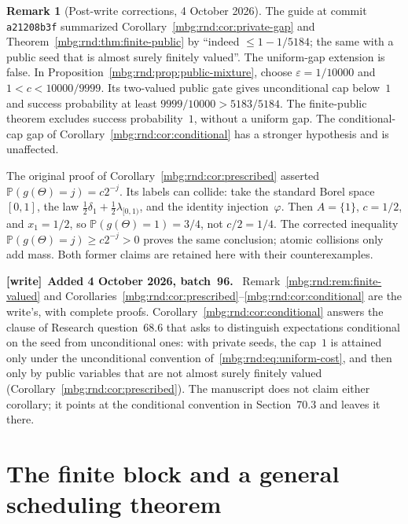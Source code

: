 \documentclass[11pt,letterpaper]{article}
\theoremstyle{definition}
\newtheorem{remark}[theorem]{Remark}
\newcommand{\Prb}{\mathbb P}
\newenvironment{writenote}[1][]{\par\smallskip\begingroup\small
 \noindent\textbf{[write]}\if\relax\detokenize{#1}\relax\else~\textbf{#1.}\fi\ }%
 {\par\endgroup\smallskip}
\begin{document}
\begin{remark}[Post-write corrections, 4 October 2026]
\label{mbg:rnd:rem:postwrite-probabilities}
The guide at commit \texttt{a21208b3f} summarized Corollary~\ref{mbg:rnd:cor:private-gap} and Theorem~\ref{mbg:rnd:thm:finite-public} by ``indeed $\le1-1/5184$; the same with a public seed that is almost surely finitely valued''. The uniform-gap extension is false. In Proposition~\ref{mbg:rnd:prop:public-mixture}, choose $\varepsilon=1/10000$ and $1<c<10000/9999$. Its two-valued public gate gives unconditional cap below~$1$ and success probability at least $9999/10000>5183/5184$. The finite-public theorem excludes success probability~$1$, without a uniform gap. The conditional-cap gap of Corollary~\ref{mbg:rnd:cor:conditional} has a stronger hypothesis and is unaffected.

The original proof of Corollary~\ref{mbg:rnd:cor:prescribed} asserted $\Prb(g(\Theta)=j)=c2^{-j}$. Its labels can collide: take the standard Borel space $[0,1]$, the law $\tfrac12\delta_1+\tfrac12\lambda_{[0,1)}$, and the identity injection~$\varphi$. Then $A=\{1\}$, $c=1/2$, and $x_1=1/2$, so $\Prb(g(\Theta)=1)=3/4$, not $c/2=1/4$. The corrected inequality $\Prb(g(\Theta)=j)\ge c2^{-j}>0$ proves the same conclusion; atomic collisions only add mass. Both former claims are retained here with their counterexamples.
\end{remark}

\begin{writenote}[Added 4 October 2026, batch~96]
Remark~\ref{mbg:rnd:rem:finite-valued} and Corollaries~\ref{mbg:rnd:cor:prescribed}--\ref{mbg:rnd:cor:conditional} are the write's, with complete proofs. Corollary~\ref{mbg:rnd:cor:conditional} answers the clause of Research question~68.6 that asks to distinguish expectations conditional on the seed from unconditional ones: with private seeds, the cap~$1$ is attained only under the unconditional convention of~\eqref{mbg:rnd:eq:uniform-cost}, and then only by public variables that are not almost surely finitely valued (Corollary~\ref{mbg:rnd:cor:prescribed}). The manuscript does not claim either corollary; it points at the conditional convention in Section~70.3 and leaves it there.
\end{writenote}

\section{The finite block and a general scheduling theorem}
\label{mbg:rnd:sec:blocks}
\end{document}
